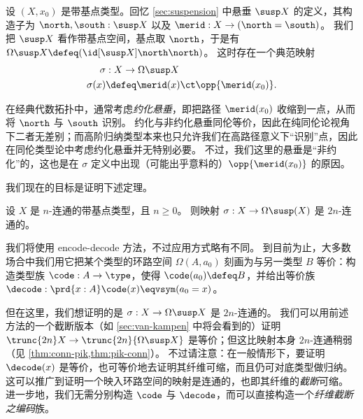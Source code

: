 设 $(X,x_0)$ 是带基点类型。回忆 \cref{sec:suspension} 中悬垂 $\susp X$ 的定义，其构造子为 $\north,\south:\susp X$ 以及 $\merid:X \to (\north=\south)$。
我们把 $\susp X$ 看作带基点空间，基点取 $\north$，于是有 $\Omega\susp X \defeq (\id[\susp X]\north\north)$。
这时存在一个典范映射
\begin{align*}
  \sigma &: X \to \Omega\susp X\\
  \sigma(x) &\defeq \merid(x) \ct \opp{\merid(x_0)}.
\end{align*}

\begin{rmk}
  在经典代数拓扑中，通常考虑\emph{约化悬垂}，即把路径 $\merid(x_0)$ 收缩到一点，从而将 $\north$ 与 $\south$ 识别。
  约化与非约化悬垂同伦等价，因此在纯同伦论视角下二者无差别；而高阶归纳类型本来也只允许我们在高路径意义下“识别”点，因此在同伦类型论中考虑约化悬垂并无特别必要。
  不过，我们这里的悬垂是“非约化”的，这也是在 $\sigma$ 定义中出现（可能出乎意料的）$\opp{\merid(x_0)}$ 的原因。
\end{rmk}

我们现在的目标是证明下述定理。

\begin{thm}\label{thm:freudenthal}
  设 $X$ 是 $n$-连通的带基点类型，且 $n\geq 0$。
  则映射 $\sigma:X\to \Omega\susp(X)$ 是 $2n$-连通的。
\end{thm}

%

我们将使用 encode-decode 方法，不过应用方式略有不同。
到目前为止，大多数场合中我们用它把某个类型的环路空间 $\Omega (A,a_0)$ 刻画为与另一类型 $B$ 等价：构造类型族 $\code:A\to \type$，使得 $\code(a_0)\defeq B$，并给出等价族 $\decode:\prd{x:A}\code(x) \eqvsym (a_0=x)$。

但在这里，我们想证明的是 $\sigma:X\to \Omega \susp X$ 是 $2n$-连通的。
我们可以用前述方法的一个截断版本（如 \cref{sec:van-kampen} 中将会看到的）证明 $\trunc{2n}X\to \trunc{2n}{\Omega \susp X}$ 是等价；但这比映射本身 $2n$-连通稍弱（见 \cref{thm:conn-pik,thm:pik-conn}）。
不过请注意：在一般情形下，要证明 $\decode(x)$ 是等价，也可等价地去证明其纤维可缩，而且仍可对底类型做归纳。
这可以推广到证明一个映入环路空间的映射是连通的，也即其纤维的\emph{截断}可缩。
进一步地，我们无需分别构造 $\code$ 与 $\decode$，而可以直接构造一个\emph{纤维截断之编码}族。

